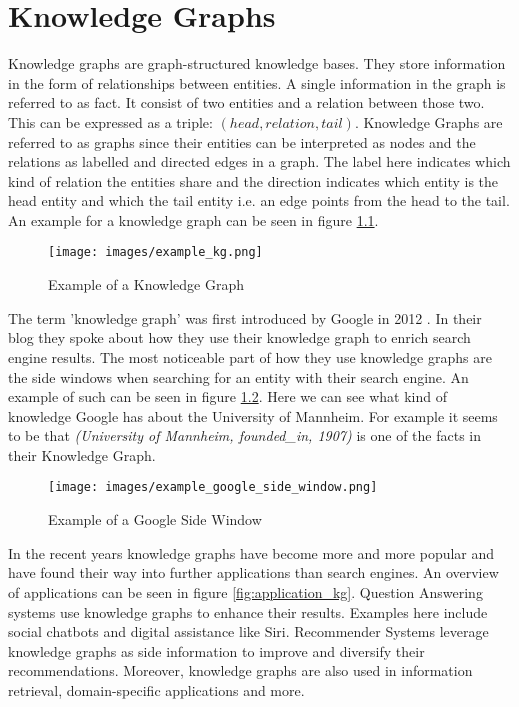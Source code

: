 \chapter{Knowledge Graphs}
\label{cha:knowledge_graphs}

Knowledge graphs are graph-structured knowledge bases. They store information in the form of relationships between entities. A single information in the graph is referred to as fact. It consist of two entities and a relation between those two. This can be expressed as a triple: $(head, relation, tail)$. Knowledge Graphs are referred to as graphs since their entities can be interpreted as nodes and the relations as labelled and directed edges in a graph. The label here indicates which kind of relation the entities share and the direction indicates which entity is the head entity and which the tail entity i.e. an edge points from the head to the tail. An example for a knowledge graph can be seen in figure \ref{fig:example_kg}. \cite{nickel_review_2015}

\begin{figure}[H]
\centering
\texttt{[image: images/example\_kg.png]}
\caption{Example of a Knowledge Graph}
\label{fig:example_kg}
\end{figure}

The term 'knowledge graph' was first introduced by Google in 2012 \cite{singhal_introducing_2012}. In their blog they spoke about how they use their knowledge graph to enrich search engine results. The most noticeable part of how they use knowledge graphs are the side windows when searching for an entity with their search engine. An example of such can be seen in figure \ref{fig:side_window_google}. Here we can see what kind of knowledge Google has about the University of Mannheim. For example it seems to be that \textit{(University of Mannheim, founded\_in, 1907)} is one of the facts in their Knowledge Graph.

\begin{figure}[H]
\centering
\texttt{[image: images/example\_google\_side\_window.png]}
\caption{Example of a Google Side Window}
\label{fig:side_window_google}
\end{figure}

In the recent years knowledge graphs have become more and more popular and have found their way into further applications than search engines. An overview of applications can be seen in figure \ref{fig:application_kg}.   Question Answering systems use knowledge graphs to enhance their results. Examples here include social chatbots and digital assistance like Siri. Recommender Systems leverage knowledge graphs as side information to improve and diversify their recommendations.  Moreover, knowledge graphs are also used in information retrieval, domain-specific applications and more. \cite{zou_survey_2020}

